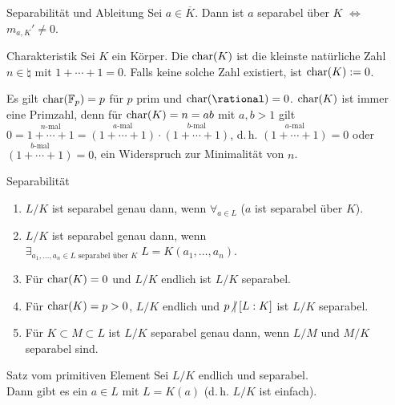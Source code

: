 \begin{Lemma}{Separabilität und Ableitung}
    Sei $a \in \overline{K}$.
    Dann ist $a$ separabel über $K$ $\iff$ $m_{a,K}' \not= 0$.
\end{Lemma}

\begin{Def}{Charakteristik}
    Sei $K$ ein Körper.
    Die  $\operatorname{char}(K)$ ist die kleinste natürliche
    Zahl $n \in \natural$ mit $1 + \dotsb + 1 = 0$.
    Falls keine solche Zahl existiert, ist $\operatorname{char}(K) := 0$.
\end{Def}

\begin{Bsp}
    Es gilt $\operatorname{char}(\mathbb{F}_p) = p$ für $p$ prim und
    $\Char(\rational) = 0$.
    $\operatorname{char}(K)$ ist immer eine Primzahl, denn für $\operatorname{char}(K) = n = ab$ mit
    $a, b > 1$ gilt $0 = \overset{n\text{-mal}}{1 + \dotsb + 1} =
    \overset{a\text{-mal}}{(1 + \dotsb + 1)} \cdot
    \overset{b\text{-mal}}{(1 + \dotsb + 1)}$, d.\,h.
    $\overset{a\text{-mal}}{(1 + \dotsb + 1)} = 0$ oder
    $\overset{b\text{-mal}}{(1 + \dotsb + 1)} = 0$, ein Widerspruch zur
    Minimalität von $n$.
\end{Bsp}

\begin{Prop}{Separabilität}
    \begin{enumerate}[label=(\alph*)]
        \item
        $L/K$ ist separabel genau dann, wenn
        $\forall_{a \in L}$ ($a$ ist separabel über $K$).
        
        \item
        $L/K$ ist separabel genau dann, wenn
        $\exists_{a_1, \dotsc, a_n \in L \text{ separabel über } K}\;
        L = K(a_1, \dotsc, a_n)$.
        
        \item
        Für $\operatorname{char}(K) = 0$ und $L/K$ endlich ist $L/K$ separabel.
        
        \item
        Für $\operatorname{char}(K) = p > 0$, $L/K$ endlich und $p \mathbin{\!\not|} [L:K]$ ist
        $L/K$ separabel.
        
        \item
        Für $K \subset M \subset L$
        ist $L/K$ separabel genau dann, wenn
        $L/M$ und $M/K$ separabel sind.
    \end{enumerate}
\end{Prop}

\begin{Theorem}{Satz vom primitiven Element}
    Sei $L/K$ endlich und separabel.\\
    Dann gibt es ein $a \in L$ mit $L = K(a)$
    (d.\,h. $L/K$ ist einfach).
\end{Theorem}

